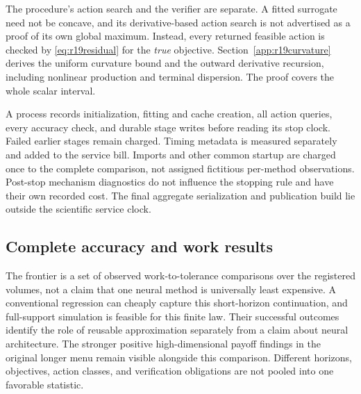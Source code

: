 The procedure's action search and the verifier are separate. A fitted
surrogate need not be concave, and its derivative-based action search is not
advertised as a proof of its own global maximum. Instead, every returned
feasible action is checked by \eqref{eq:r19residual} for the \emph{true}
objective. Section~\ref{app:r19curvature} derives the uniform curvature
bound and the outward derivative recursion, including nonlinear production
and terminal dispersion. The proof covers the whole scalar interval.

A process records initialization, fitting and cache creation, all action
queries, every accuracy check, and durable stage writes before reading its
stop clock. Failed earlier stages remain charged. Timing metadata is measured
separately and added to the service bill. Imports and other common startup
are charged once to the complete comparison, not assigned fictitious
per-method observations. Post-stop mechanism diagnostics do not influence
the stopping rule and have their own recorded cost. The final aggregate
serialization and publication build lie outside the scientific service clock.

\subsection{Complete accuracy and work results}




The frontier is a set of observed work-to-tolerance comparisons over the
registered volumes, not a claim that one neural method is universally least
expensive. A conventional regression can cheaply capture this short-horizon
continuation, and full-support simulation is feasible for this finite law.
Their successful outcomes identify the role of reusable approximation
separately from a claim about neural architecture. The stronger positive
high-dimensional payoff findings in the original longer menu remain visible
alongside this comparison. Different horizons, objectives, action classes,
and verification obligations are not pooled into one favorable statistic.

